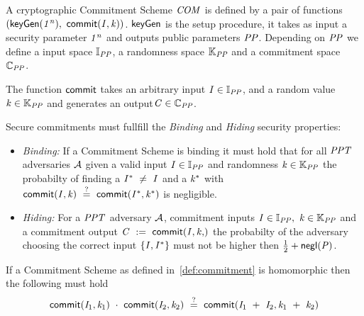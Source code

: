 \begin{definition}\label{def:commitment}
    A cryptographic Commitment Scheme $\mathit{COM}$ is defined by a pair of functions $(\mathsf{keyGen}(\mathit{1^n}) ,~ \mathsf{commit}(\mathit{I}, \mathit{k}))$. $\mathsf{keyGen}$ is the setup procedure, it takes as input a
    security parameter $\mathit{1^n}$ and outputs public parameters $\mathit{PP}$. Depending on $\mathit{PP}$ we define a input space $\mathbb{I}_{\mathit{PP}}$,
    a randomness space $\mathbb{K}_{\mathit{PP}}$ and a commitment space $\mathbb{C}_{\mathit{PP}}$.

    The function $\mathsf{commit}$ takes an arbitrary input $\mathit{I} \in \mathbb{I}_{\mathit{PP}}$, and a random value $\mathit{k} \in \mathbb{K}_{\mathit{PP}}$ and
    generates an output$\mathit{C} \in \mathbb{C}_{\mathit{PP}}$.

    Secure commitments must fullfill the \textit{Binding} and \textit{Hiding} security properties:
    \begin{itemize}
        \item \textit{Binding:} If a Commitment Scheme is binding it must hold that for all $\mathit{PPT}$ adversaries $\mathcal{A}$ given a valid input $\mathit{I} \in \mathbb{I}_{\mathit{PP}}$
        and randomness $\mathit{k} \in \mathbb{K}_{\mathit{PP}}$ the probabilty of finding a $\mathit{I}^* ~\neq~ \mathit{I}$ and a $\mathit{k}^*$ with
        $\mathsf{commit}(\mathit{I}, \mathit{k}) ~\stackrel{?}{=}~ \mathsf{commit}(\mathit{I}^*, \mathit{k}^*)$ is negligible.
        \item \textit{Hiding:} For a $\mathit{PPT}$ adversary $\mathcal{A}$, commitment inputs $\mathit{I} \in \mathbb{I}_{\mathit{PP}} ,~ \mathit{k} \in
       \mathbb{K}_{\mathit{PP}}$ and a commitment output $\varCommitment \opAssign \procCommit{\varInput, \varNonce}$ the probabilty of the adversary choosing the correct input
        $\{\mathit{I}, \mathit{I}^*\}$ must not be higher then $\frac{1}{2} + \mathsf{negl}(\mathit{P})$. 
    \end{itemize}
\end{definition}

\begin{definition}\label{def:homomorphicCom}
    If a Commitment Scheme as defined in~\ref{def:commitment} is homomorphic then the following must hold
    \[ \mathsf{commit}(\mathit{I}_1, \mathit{k}_1) ~\cdot~ \mathsf{commit}(\mathit{I}_2, \mathit{k}_2) ~\stackrel{?}{=}~ \mathsf{commit}(\mathit{I}_1 ~+~ \mathit{I}_2, \mathit{k}_1 ~+~ \mathit{k}_2) \]
\end{definition}

